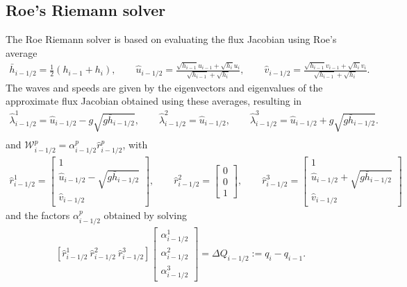 \documentclass[preprint, 11pt]{article}
\newcommand{\W}{{\mathcal W}}
\newcommand{\imh}{{i-1/2}}
\newcommand{\bfr}{{r}}
\begin{document}
\subsection{Roe's Riemann solver} \label{sec:roe}
The Roe Riemann solver is based on evaluating the flux Jacobian using Roe's average
\begin{align}\label{roe_average}
  \bar h_{i-1/2}=\frac{1}{2}(h_{i-1}+h_i), \qquad
  \hat u_{i-1/2}=\frac{\sqrt{h_{i-1}}u_{i-1}+\sqrt{h_i}u_i}{\sqrt{h_{i-1}}+\sqrt{h_i}}, \qquad
  \hat v_{i-1/2}=\frac{\sqrt{h_{i-1}}v_{i-1}+\sqrt{h_i}v_i}{\sqrt{h_{i-1}}+\sqrt{h_i}}.
\end{align}
The waves and speeds are given by the eigenvectors and eigenvalues of the approximate
flux Jacobian obtained using these averages, resulting in
\begin{align*}
  \hat\lambda_{i-1/2}^1=\hat u_{i-1/2}-g\sqrt{g\bar h_{i-1/2}}, \qquad
  \hat\lambda_{i-1/2}^2=\hat u_{i-1/2}, \qquad
  \hat\lambda_{i-1/2}^3=\hat u_{i-1/2}+g\sqrt{g\bar h_{i-1/2}}. \\
\end{align*}
and $\W_{i-1/2}^p=\alpha_{i-1/2}^p\hat r_{i-1/2}^p$, with
\begin{align*}
  \hat \bfr^1_{i-1/2} =
  \begin{bmatrix}
    1 \\
    \hat u_{i-1/2}-\sqrt{g\bar h_{i-1/2}}\\
    \hat v_{i-1/2}
  \end{bmatrix},
  \qquad
  \hat \bfr^2_{i-1/2} =
  \begin{bmatrix}
    0\\
    0\\
    1
  \end{bmatrix},
  \qquad
  \hat \bfr^3_{i-1/2} =
  \begin{bmatrix}
    1 \\
    \hat u_{i-1/2}+\sqrt{g\bar h_{i-1/2}}\\
    \hat v_{i-1/2}
  \end{bmatrix}
\end{align*}
and the factors $\alpha^p_\imh$ obtained by solving
\begin{align}\label{system_for_alphas}
  \left[\hat \bfr^1_{i-1/2} ~\hat \bfr^2_{i-1/2} ~\hat \bfr^3_{i-1/2}\right]
  \begin{bmatrix}
    \alpha^1_{i-1/2} \\
    \alpha^2_{i-1/2} \\
    \alpha^3_{i-1/2}
  \end{bmatrix}
  =\Delta Q_{i-1/2}:=q_i-q_{i-1}.
\end{align}
\end{document}
